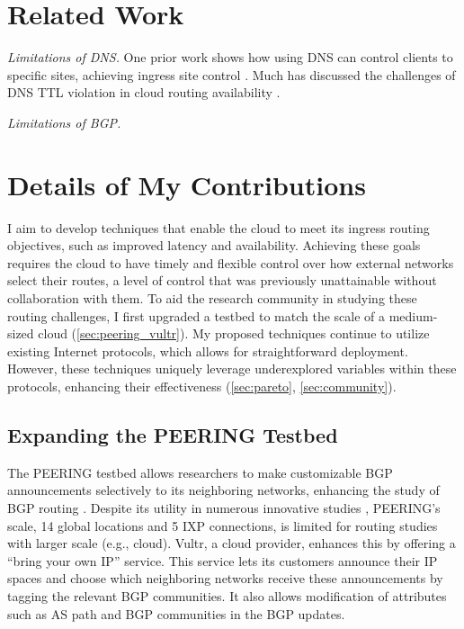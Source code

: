 \documentclass[sigconf,nonacm,screen,letterpaper,9pt]{acmart}
\begin{document}
\hypertarget{related-work}{%
\section{Related Work}\label{related-work}}

\emph{Limitations of DNS.} One prior work shows how using DNS can
control clients to specific sites, achieving ingress site control
\cite{end-user-mapping}. Much has discussed the challenges of DNS TTL
violation in cloud routing availability
\cite{cache-me-if-you-can, dns-performance-caching, dns-in-context}.

\emph{Limitations of BGP.}

\hypertarget{details-of-my-contributions}{%
\section{Details of My
Contributions}\label{details-of-my-contributions}}

I aim to develop techniques that enable the cloud to meet its ingress
routing objectives, such as improved latency and availability. Achieving
these goals requires the cloud to have timely and flexible control over
how external networks select their routes, a level of control that was
previously unattainable without collaboration with them. To aid the
research community in studying these routing challenges, I first
upgraded a testbed to match the scale of a medium-sized cloud
(\cref{sec:peering_vultr}). My proposed techniques continue to utilize
existing Internet protocols, which allows for straightforward
deployment. However, these techniques uniquely leverage underexplored
variables within these protocols, enhancing their effectiveness
(\cref{sec:pareto}, \cref{sec:community}).

\hypertarget{expanding-the-peering-testbed}{%
\subsection{Expanding the PEERING
Testbed}\label{expanding-the-peering-testbed}}

\label{sec:peering_vultr} The PEERING testbed allows researchers to make
customizable BGP announcements selectively to its neighboring networks,
enhancing the study of BGP routing \cite{schlinker19peering}. Despite
its utility in numerous innovative studies
\cite{painter, imc-jc-deanony, vermeulen2022internet, anycast-agility, rtt-monitor},
PEERING's scale, 14 global locations and 5 IXP connections, is limited
for routing studies with larger scale (e.g., cloud). Vultr, a cloud
provider, enhances this by offering a ``bring your own IP'' service.
This service lets its customers announce their IP spaces and choose
which neighboring networks receive these announcements by tagging the
relevant BGP communities. It also allows modification of attributes such
as AS path and BGP communities in the BGP updates.
\end{document}
